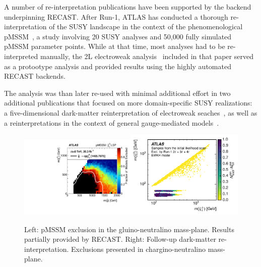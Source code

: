 A number of re-interpretation publications have been supported by the backend underpinning RECAST. After Run-1, ATLAS has conducted a thorough re-interpretation of the SUSY landscape in the context of the phenomenological pMSSM~\cite{Aad:2015baa}, a study involving 20 SUSY analyses and 50,000 fully simulated pMSSM parameter points. While at that time, most analyses had to be re-interpreted manually, the 2L electroweak analysis~\cite{Aad:2014vma} included in that paper served as a protootype analysis and provided results using the highly automated RECAST backends.

The analysis was than later re-used with minimal additional effort in two additional publications that focused on more domain-specific SUSY realizations: a five-dimensional dark-matter reinterpretation of electroweak seaches~\cite{Aaboud:2016wna}, as well as a reinterpretations in the context of general gauge-mediated models~\cite{ATLAS-CONF-2016-033}.

\begin{figure}[h]
\begin{center}
\includegraphics[width=0.5\textwidth,angle=0]{ch5-figures/pMSSM.pdf}\includegraphics[width=0.5\textwidth,angle=0]{ch5-figures/DM.pdf}

\end{center}
\caption{
Left: pMSSM exclusion in the gluino-neutralino mass-plane. Results partially provided by RECAST.
Right: Follow-up dark-matter re-interpretation. Exclusions presented in chargino-neutralino mass-plane.
}
\label{fig:recast-cc}
\end{figure}

